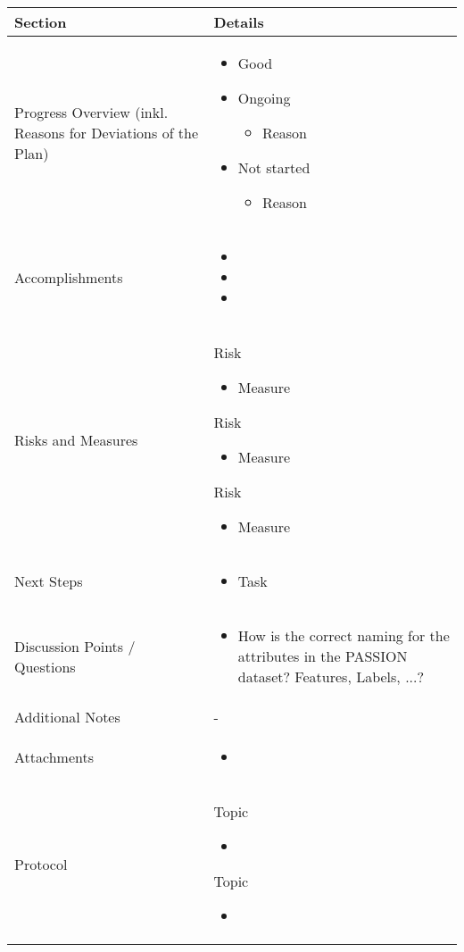 \documentclass[a4paper,11pt]{article}
\newcommand{\done}{\textcolor{green}{\ding{52}}}
\newcommand{\ongoing}{\textcolor{orange}{\ding{45}}}
\newcommand{\notstarted}{\textcolor{red}{\ding{56}}}
\begin{document}
	
	\renewcommand{\arraystretch}{1.5}
	\begin{longtable}{|p{3.5cm}|p{12cm}|}
		\hline
		\textbf{Section} & \textbf{Details} \\
		\hline
		Progress Overview (inkl. Reasons for Deviations of the Plan) & \begin{itemize}
			\item[\done] Good
			\item[\ongoing] Ongoing
			\begin{itemize}
				\item Reason
			\end{itemize}
			\item[\notstarted] Not started
			\begin{itemize}
				\item Reason
			\end{itemize}
		\end{itemize} \\
		\hline
		Accomplishments & \begin{itemize}
			\item[\done] 
			\item[\done] 
			\item[\done] 
		\end{itemize} \\
		\hline
		Risks and Measures & 
		Risk
		\begin{itemize}
			\item Measure
		\end{itemize}
		
	    Risk
		\begin{itemize}
			\item Measure
		\end{itemize}
		
		Risk
		\begin{itemize}
			\item Measure
		\end{itemize} \\
		
		\hline
		Next Steps & \begin{itemize}
			\item Task
		\end{itemize} \\
		\hline
		Discussion Points / Questions & \begin{itemize}
			\item How is the correct naming for the attributes in the PASSION dataset? Features, Labels, ...?
		\end{itemize} \\
		\hline
		Additional Notes & - \\
		\hline
		Attachments  & \begin{itemize}
			\item 
		\end{itemize} \\
		\hline
		Protocol  & 
		Topic
		\begin{itemize}
			\item 
		\end{itemize}
		
		Topic
		\begin{itemize}
			\item 
		\end{itemize} \\
		\hline
	\end{longtable}
	
\end{document}
